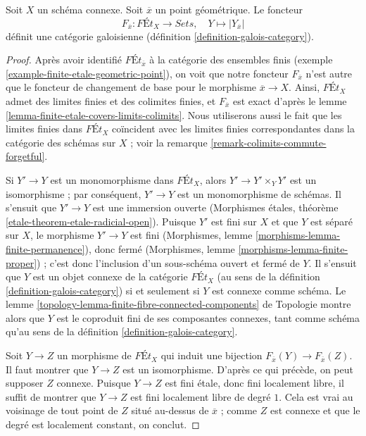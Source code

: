 \begin{lemma}
\label{lemma-finite-etale-connected-galois-category}
Soit $X$ un schéma connexe. Soit $\overline{x}$ un point géométrique.
Le foncteur
$$
F_{\overline{x}} : \textit{F\'Et}_X \longrightarrow \textit{Sets},\quad
Y \longmapsto |Y_{\overline{x}}|
$$
définit une catégorie galoisienne (définition \ref{definition-galois-category}).
\end{lemma}

\begin{proof}
Après avoir identifié $\textit{F\'Et}_{\overline{x}}$ à la catégorie des
ensembles finis (exemple \ref{example-finite-etale-geometric-point}),
on voit que notre foncteur $F_{\overline{x}}$ n'est autre que
le foncteur de changement de base pour le morphisme $\overline{x} \to X$.
Ainsi, $\textit{F\'Et}_X$ admet des limites finies et des colimites finies,
et $F_{\overline{x}}$ est exact d'après le
lemme \ref{lemma-finite-etale-covers-limits-colimits}.
Nous utiliserons aussi le fait que les limites finies dans $\textit{F\'Et}_X$
coïncident avec les limites finies correspondantes dans la catégorie
des schémas sur $X$ ; voir la remarque \ref{remark-colimits-commute-forgetful}.

\medskip\noindent
Si $Y' \to Y$ est un monomorphisme dans $\textit{F\'Et}_X$,
alors $Y' \to Y' \times_Y Y'$ est un isomorphisme ; par
conséquent, $Y' \to Y$ est un monomorphisme de schémas. Il s'ensuit que
$Y' \to Y$ est une immersion ouverte
(Morphismes étales, théorème \ref{etale-theorem-etale-radicial-open}). Puisque
$Y'$ est fini sur $X$ et que $Y$ est séparé sur $X$,
le morphisme $Y' \to Y$ est fini
(Morphismes, lemme \ref{morphisms-lemma-finite-permanence}), donc fermé
(Morphismes, lemme \ref{morphisms-lemma-finite-proper}) ;
c'est donc l'inclusion d'un sous-schéma ouvert et fermé de $Y$.
Il s'ensuit que $Y$ est un objet connexe de la catégorie
$\textit{F\'Et}_X$ (au sens de la définition \ref{definition-galois-category})
si et seulement si $Y$ est connexe comme schéma. Le
lemme \ref{topology-lemma-finite-fibre-connected-components} de Topologie
montre alors que $Y$ est le coproduit fini de ses composantes connexes,
tant comme schéma qu'au sens de la
définition \ref{definition-galois-category}.

\medskip\noindent
Soit $Y \to Z$ un morphisme de $\textit{F\'Et}_X$ qui induit une
bijection $F_{\overline{x}}(Y) \to F_{\overline{x}}(Z)$. Il faut
montrer que $Y \to Z$ est un isomorphisme. D'après ce qui précède, on peut
supposer $Z$ connexe. Puisque $Y \to Z$ est fini étale, donc fini
localement libre, il suffit de montrer que $Y \to Z$ est fini localement
libre de degré $1$. Cela est vrai au voisinage de tout point de
$Z$ situé au-dessus de $\overline{x}$ ; comme $Z$ est connexe et que
le degré est localement constant, on conclut.
\end{proof}



